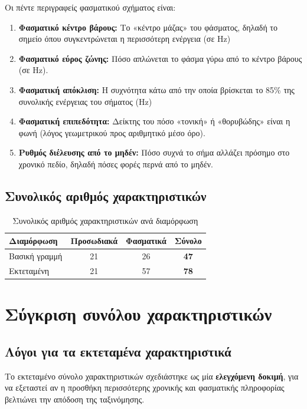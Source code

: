 Οι πέντε περιγραφείς φασματικού σχήματος είναι:

\begin{enumerate}
    \item \textbf{Φασματικό κέντρο βάρους:} Το «κέντρο μάζας» του φάσματος, δηλαδή το σημείο όπου συγκεντρώνεται η περισσότερη ενέργεια (σε Hz)
    \item \textbf{Φασματικό εύρος ζώνης:} Πόσο απλώνεται το φάσμα γύρω από το κέντρο βάρους (σε Hz).
    \item \textbf{Φασματική απόκλιση:} Η συχνότητα κάτω από την οποία βρίσκεται το 85\% της συνολικής ενέργειας του σήματος (Hz)
    \item \textbf{Φασματική επιπεδότητα:} Δείκτης του πόσο «τονική» ή «θορυβώδης» είναι η φωνή (λόγος γεωμετρικού προς αριθμητικό μέσο όρο).
    \item \textbf{Ρυθμός διέλευσης από το μηδέν:} Πόσο συχνά το σήμα αλλάζει πρόσημο στο χρονικό πεδίο, δηλαδή πόσες φορές περνά από το μηδέν.
\end{enumerate}

\subsection{Συνολικός αριθμός χαρακτηριστικών}

\begin{table}[H]
\centering
\begin{tabular}{@{}lccc@{}}
\toprule
\textbf{Διαμόρφωση} & \textbf{Προσωδιακά} & \textbf{Φασματικά} & \textbf{Σύνολο} \\
\midrule
Βασική γραμμή & 21 & 26 & \textbf{47} \\
Εκτεταμένη & 21 & 57 & \textbf{78} \\
\bottomrule
\end{tabular}
\caption{Συνολικός αριθμός χαρακτηριστικών ανά διαμόρφωση}
\label{tab:feature-counts}
\end{table}

\section{Σύγκριση συνόλου χαρακτηριστικών}

\subsection{Λόγοι για τα εκτεταμένα χαρακτηριστικά}

Το εκτεταμένο σύνολο χαρακτηριστικών σχεδιάστηκε ως μία \textbf{ελεγχόμενη δοκιμή}, 
για να εξεταστεί αν η προσθήκη περισσότερης χρονικής και φασματικής πληροφορίας βελτιώνει την απόδοση της ταξινόμησης. 

